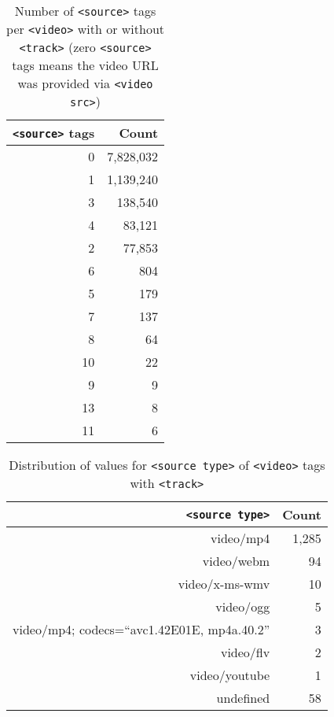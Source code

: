 \documentclass{sig-alternate}
\begin{document}
\begin{table}[p]
  \centering
  \begin{tabular}{ r | r }
    \texttt{<source>} tags & Count \\
    \hline
    0 & 7,828,032\\
    1 & 1,139,240\\
    3 & 138,540\\
    4 & 83,121\\    
    2 & 77,853\\
    6 & 804\\    
    5 & 179\\
    7 & 137\\
    8 & 64\\
    10 & 22\\    
    9 & 9\\
    13 & 8\\
    11 & 6\\
  \end{tabular}
  \caption{Number of \texttt{<source>} tags per
    \texttt{<video>} with or without \texttt{<track>}
    \tiny (zero \texttt{<source>}
    tags means the video URL was provided via
    \texttt{<video src>})}
  \label{table:sourceFull}    
\end{table}

\begin{table}[p]
  \centering
  \begin{tabular}{ r | r }
    \texttt{<source type>} & Count \\
    \hline
    video/mp4 & 1,285\\
    video/webm & 94\\
    video/x-ms-wmv & 10\\    
    video/ogg & 5\\    
    video/mp4; codecs=``avc1.42E01E, mp4a.40.2'' & 3\\
    video/flv & 2\\
    video/youtube & 1\\    
    undefined & 58\\  
  \end{tabular}
  \caption{Distribution of values for \texttt{<source type>}
    of \texttt{<video>} tags with \texttt{<track>}}
  \label{table:type}    
\end{table}
\end{document}
